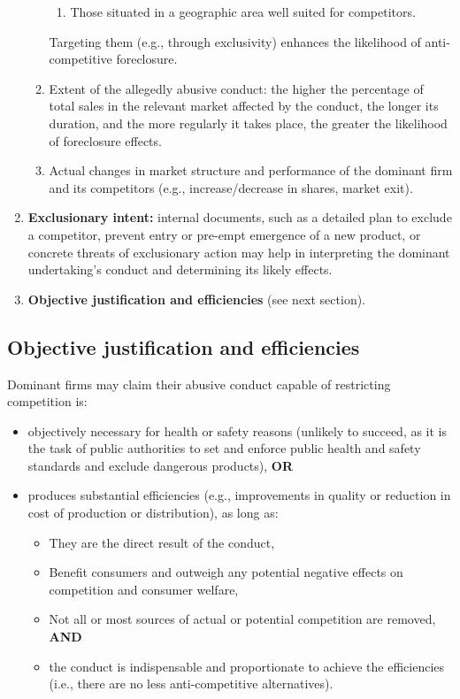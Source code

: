 \begin{enumerate}
\begin{enumerate}[label=\roman*.]
\begin{enumerate}
            \item Those situated in a geographic area well suited for competitors.
        \end{enumerate}
        Targeting them (e.g., through exclusivity) enhances the likelihood of anti-competitive foreclosure.
        \item Extent of the allegedly abusive conduct: the higher the percentage of total sales in the relevant market affected by the conduct, the longer its duration, and the more regularly it takes place, the greater the likelihood of foreclosure effects.
        \item Actual changes in market structure and performance of the dominant firm and its competitors (e.g., increase/decrease in shares, market exit).
    \end{enumerate}
    \item \textbf{Exclusionary intent:} internal documents, such as a detailed plan to exclude a competitor, prevent entry or pre-empt emergence of a new product, or concrete threats of exclusionary action may help in interpreting the dominant undertaking's conduct and determining its likely effects.
    \item \textbf{Objective justification and efficiencies} (see next section).
\end{enumerate}

    \subsection{Objective justification and efficiencies}

        Dominant firms may claim their abusive conduct capable of restricting competition is:
        
        \begin{itemize}
            \item objectively necessary for health or safety reasons (unlikely to succeed, as it is the task of public authorities to set and enforce public health and safety standards and exclude dangerous products), \textbf{OR}
            \item produces substantial efficiencies (e.g., improvements in quality or reduction in cost of production or distribution), as long as:
            \begin{itemize}
                \item They are the direct result of the conduct,
                \item Benefit consumers and outweigh any potential negative effects on competition and consumer welfare,
                \item Not all or most sources of actual or potential competition are removed, \textbf{AND}
                \item the conduct is indispensable and proportionate to achieve the efficiencies (i.e., there are no less anti-competitive alternatives).
            \end{itemize}
        \end{itemize}

